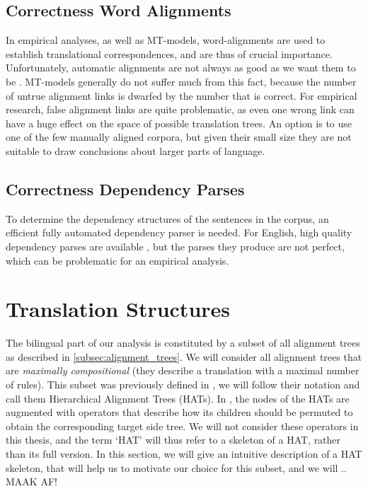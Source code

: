 \documentclass{report}
\begin{document}
\subsection{Correctness Word Alignments}

In empirical analyses, as well as MT-models, word-alignments are used to establish translational correspondences, and are thus of crucial importance. Unfortunately, automatic alignments are not always as good as we want them to be \citep{och2000improved}. MT-models generally do not suffer much from this fact, because the number of untrue alignment links is dwarfed by the number that is correct. For empirical research, false alignment links are quite problematic, as even one wrong link can have a huge effect on the space of possible translation trees. An option is to use one of the few manually aligned corpora, but given their small size they are not suitable to draw conclusions about larger parts of language.

\subsection{Correctness Dependency Parses}

To determine the dependency structures of the sentences in the corpus, an efficient fully automated dependency parser is needed.  For English, high quality dependency parses are available \citep{cer2010parsing}, but the parses they produce are not perfect, which can be problematic for an empirical analysis.



\section{Translation Structures}

The bilingual part of our analysis is constituted by a subset of all alignment trees as described in \ref{subsec:alignment_trees}. We will consider all alignment trees that are \textit{maximally compositional} (they describe a translation with a maximal number of rules). This subset was previously defined in \cite{simaan2013hats}, we will follow their notation and call them Hierarchical Alignment Trees (HATs). In \cite{simaan2013hats}, the nodes of the HATs are augmented with operators that describe how its children should be permuted to obtain the corresponding target side tree. We will not consider these operators in this thesis, and the term `HAT' will thus refer to a skeleton of a HAT, rather than its full version. In this section, we will give an intuitive description of a HAT skeleton, that will help us to motivate our choice for this subset, and we will ..  MAAK AF!
\end{document}
